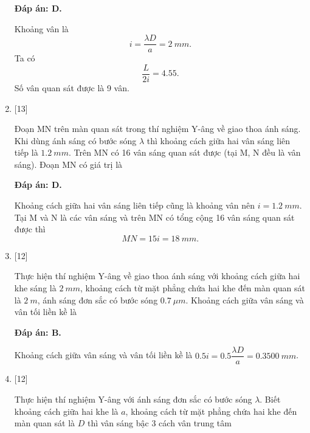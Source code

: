 \begin{enumerate}[label=\bfseries Câu \arabic*:]
	\loigiai
	{		\textbf{Đáp án: D.}
		
		Khoảng vân là
		$$
		i = \dfrac{\lambda D}{a} = \SI{2}{mm}.
		$$
		Ta có
		$$
		\dfrac{L}{2i} = \num{4,55}.
		$$
		Số vân quan sát được là 9 vân.
	}
	
	\item {} [13]
	\cauhoi
	{Đoạn MN trên màn quan sát trong thí nghiệm Y-âng về giao thoa ánh sáng. Khi dùng ánh sáng có bước sóng $\lambda$ thì khoảng cách giữa hai vân sáng liên tiếp là $\SI{1,2}{mm}$. Trên MN có 16 vân sáng quan sát được (tại M, N đều là vân sáng). Đoạn MN có giá trị là
	}
	
	\loigiai
	{		\textbf{Đáp án: D.}
		
		Khoảng cách giữa hai vân sáng liên tiếp cũng là khoảng vân nên $i = \SI{1,2}{mm}$.
		Tại M và N là các vân sáng và trên MN có tổng cộng 16 vân sáng quan sát được thì
		$$
		MN = 15i = \SI{18}{mm}.
		$$
	}
	\item {} [12]
	\cauhoi
	{Thực hiện thí nghiệm Y-âng về giao thoa ánh sáng với khoảng cách giữa hai khe sáng là $\SI{2}{mm}$, khoảng cách từ mặt phẳng chứa hai khe đến màn quan sát là $\SI{2}{m}$, ánh sáng đơn sắc có bước sóng $\SI{0,7}{\mu m}$. Khoảng cách giữa vân sáng và vân tối liền kề là 
		
	}
	
	\loigiai
	{		\textbf{Đáp án: B.}
		
		Khoảng cách giữa vân sáng và vân tối liền kề là $\num{0,5} i = \num{0,5} \dfrac{\lambda D}{a} = \SI{0,3500}{mm}$.		
	}
	
	\item {} [12]
	\cauhoi
	{Thực hiện thí nghiệm Y-âng với ánh sáng đơn sắc có bước sóng $\lambda$. Biết khoảng cách giữa hai khe là $a$, khoảng cách từ mặt phẳng chứa hai khe đến màn quan sát là $D$ thì vân sáng bậc 3 cách vân trung tâm 
	}
	

\end{enumerate}
